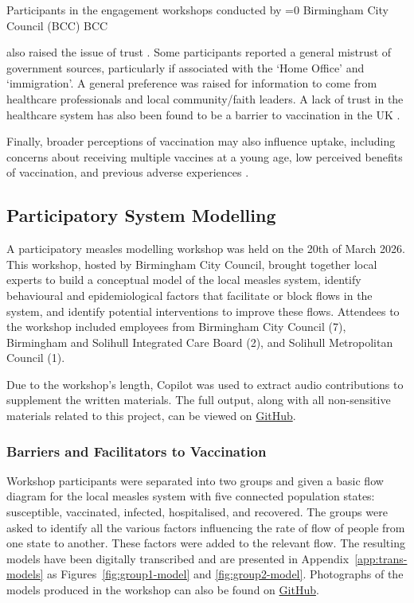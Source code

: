\documentclass[12pt]{article}
\newcounter{bcc}
\newcommand{\bcc}{%
    \ifnum\value{bcc}=0
        \stepcounter{bcc}%
        Birmingham City Council (BCC)%
        \else
        BCC%
    \fi%
    \xspace
}
\begin{document}
Participants in the engagement workshops conducted by \bcc also raised the issue of trust \cite{bissett_measles_soft_intelligence_2024, palmer_birmingham_measles_engagement_2024}. Some participants reported a general mistrust of government sources, particularly if associated with the ‘Home Office’ and ‘immigration’. A general preference was raised for information to come from healthcare professionals and local community/faith leaders. A lack of trust in the healthcare system has also been found to be a barrier to vaccination in the UK \cite{torracinta2021mmr}.

Finally, broader perceptions of vaccination may also influence uptake, including concerns about receiving multiple vaccines at a young age, low perceived benefits of vaccination, and previous adverse experiences \cite{novilla2023parents, komurluouglu2025vaccine}.

\subsection{Participatory System Modelling}
A participatory measles modelling workshop was held on the 20th of March 2026. This workshop, hosted by Birmingham City Council, brought together local experts to build a conceptual model of the local measles system, identify behavioural and epidemiological factors that facilitate or block flows in the system, and identify potential interventions to improve these flows. Attendees to the workshop included employees from Birmingham City Council (7), Birmingham and Solihull Integrated Care Board (2), and Solihull Metropolitan Council (1).

Due to the workshop's length, Copilot was used to extract audio contributions to supplement the written materials. The full output, along with all non-sensitive materials related to this project, can be viewed on  \href{https://github.com/David-Ellis/Measles-System-Dynamics-BSol}{GitHub}. 

\subsubsection{Barriers and Facilitators to Vaccination}

Workshop participants were separated into two groups and given a basic flow diagram for the local measles system with five connected population states: susceptible, vaccinated, infected, hospitalised, and recovered. The groups were asked to identify all the various factors influencing the rate of flow of people from one state to another. These factors were added to the relevant flow. The resulting models have been digitally transcribed and are presented in Appendix~\ref{app:trans-models} as Figures~\ref{fig:group1-model} and \ref{fig:group2-model}. Photographs of the models produced in the workshop can also be found on \href{https://github.com/David-Ellis/Measles-System-Dynamics-BSol}{GitHub}.
\end{document}

